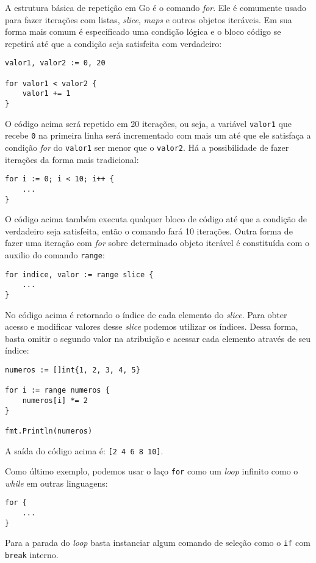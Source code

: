 \documentclass{SBCbookchapter}
\begin{document}
A estrutura básica de repetição em Go é o comando \textit{for}. Ele é comumente usado para fazer iterações com listas, \textit{slice}, \textit{maps} e outros objetos iteráveis. Em sua forma mais comum é especificado uma condição lógica e o bloco código se repetirá até que a condição seja satisfeita com verdadeiro:

\begin{lstlisting}
valor1, valor2 := 0, 20

for valor1 < valor2 {
	valor1 += 1
}
\end{lstlisting}

O código acima será repetido em 20 iterações, ou seja, a variável \texttt{valor1} que recebe \texttt{0} na primeira linha será incrementado com mais um até que ele satisfaça a condição \textit{for} do \texttt{valor1} ser menor que o \texttt{valor2}. Há a possibilidade de fazer iterações da forma mais tradicional: 

\begin{lstlisting}
for i := 0; i < 10; i++ {
	...
}
\end{lstlisting}

O código acima também executa qualquer bloco de código até que a condição de verdadeiro seja satisfeita, então o comando fará 10 iterações. Outra forma de fazer uma iteração com \textit{for} sobre determinado objeto iterável é constituída com o auxilio do comando \texttt{range}:

\begin{lstlisting}
for indice, valor := range slice {
	...
}
\end{lstlisting}

No código acima é retornado o índice de cada elemento do \textit{slice}. Para obter acesso e modificar valores desse \textit{slice} podemos utilizar os índices. Dessa forma, basta omitir o segundo valor na atribuição e acessar cada elemento através de seu índice: 


\begin{lstlisting}
numeros := []int{1, 2, 3, 4, 5}

for i := range numeros {
	numeros[i] *= 2
}

fmt.Println(numeros)
\end{lstlisting}

A saída do código acima é: \texttt{[2 4 6 8 10]}.

Como último exemplo, podemos usar o laço \texttt{for} como um \textit{loop} infinito como o \textit{while} em outras linguagens:
\begin{lstlisting}
for {
	...
}
\end{lstlisting}
Para a parada do \textit{loop} basta instanciar algum comando de seleção como o \texttt{if} com \texttt{break} interno.
\end{document}
